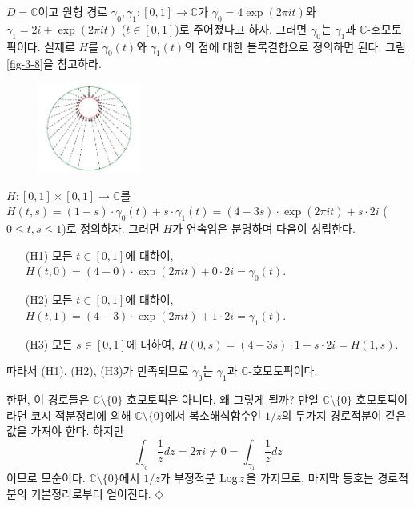 \begin{salt_example} \label{example-2-8}
$D=\mathbb C$이고 원형 경로 $\gamma_0, \gamma_1 : [0,1] \to \mathbb C$가
$\gamma_0 = 4\exp(2\pi it)$와 $\gamma_1 = 2i+\exp(2\pi it)$ ($t\in[0,1]$)로 주어졌다고 하자.
그러면 $\gamma_0$는 $\gamma_1$과 $\mathbb C$-호모토픽이다.
실제로  $H$를 $\gamma_0(t)$와 $\gamma_1(t)$의 점에 대한 볼록결합으로 정의하면 된다.
그림 \ref{fig-3-8}을 참고하라.

\begin{figure}[!h]
\begin{center}
\includegraphics[width=0.3\textwidth]{./SaltChapter/fig-3-0-3}
\end{center}
\end{figure}

$H:[0,1]\times [0,1] \to \mathbb C$를 
$H(t,s) = (1-s)\cdot \gamma_0(t) + s\cdot \gamma_1(t)
= (4-3s)\cdot \exp(2\pi it) + s\cdot 2i$ ($0\le t,s\le 1$)로 정의하자.
그러면 $H$가 연속임은 분명하며 다음이 성립한다.
\begin{itemize}
\item[(H1)] 모든 $t\in [0,1]$에 대하여, $H(t,0)= (4-0)\cdot \exp(2\pi it) + 0\cdot 2i = \gamma_0(t)$.
\item[(H2)] 모든 $t\in [0,1]$에 대하여, $H(t,1)= (4-3)\cdot \exp(2\pi it) + 1\cdot 2i = \gamma_1(t)$.
\item[(H3)] 모든 $s\in [0,1]$에 대하여, $H(0,s)= (4-3s)\cdot 1 + s\cdot 2i = H(1,s)$.
\end{itemize}
따라서 (H1), (H2), (H3)가 만족되므로 
$\gamma_0$는 $\gamma_1$과 $\mathbb C$-호모토픽이다.

한편, 이 경로들은 $\mathbb C\setminus \{0\}$-호모토픽은 아니다.
왜 그렇게 될까? 만일 $\mathbb C\setminus \{0\}$-호모토픽이라면
코시-적분정리에 의해 $\mathbb C\setminus \{0\}$에서 복소해석함수인
$1/z$의 두가지 경로적분이 같은 값을 가져야 한다. 하지만
\[
\int_{\gamma_0} \dfrac 1z dz = 2\pi i \ne 0 = \int_{\gamma_1} \dfrac 1z dz
\]
이므로 모순이다. 
$\mathbb C\setminus \{0\}$에서 $1/z$가 부정적분 $\mathop{\mathrm{Log}} z$을 가지므로,
마지막 등호는 경로적분의 기본정리로부터 얻어진다.
\hfill $\diamondsuit$
\end{salt_example}

